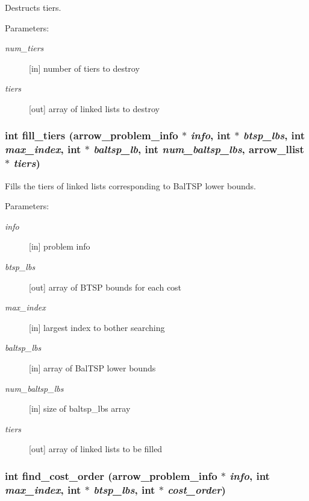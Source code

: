 Destructs tiers. 

\begin{Desc}
\item[Parameters:]
\begin{description}
\item[{\em num\_\-tiers}]\mbox{[}in\mbox{]} number of tiers to destroy \item[{\em tiers}]\mbox{[}out\mbox{]} array of linked lists to destroy \end{description}
\end{Desc}
\hypertarget{lib_2baltsp_2baltsp-ib_8c_42c557c4a5d3133300ce63b8b5e291c5}{
\subsubsection[{fill\_\-tiers}]{\setlength{\rightskip}{0pt plus 5cm}int fill\_\-tiers ({\bf arrow\_\-problem\_\-info} $\ast$ {\em info}, \/  int $\ast$ {\em btsp\_\-lbs}, \/  int {\em max\_\-index}, \/  int $\ast$ {\em baltsp\_\-lb}, \/  int {\em num\_\-baltsp\_\-lbs}, \/  {\bf arrow\_\-llist} $\ast$ {\em tiers})}}
\label{lib_2baltsp_2baltsp-ib_8c_42c557c4a5d3133300ce63b8b5e291c5}


Fills the tiers of linked lists corresponding to BalTSP lower bounds. 

\begin{Desc}
\item[Parameters:]
\begin{description}
\item[{\em info}]\mbox{[}in\mbox{]} problem info \item[{\em btsp\_\-lbs}]\mbox{[}out\mbox{]} array of BTSP bounds for each cost \item[{\em max\_\-index}]\mbox{[}in\mbox{]} largest index to bother searching \item[{\em baltsp\_\-lbs}]\mbox{[}in\mbox{]} array of BalTSP lower bounds \item[{\em num\_\-baltsp\_\-lbs}]\mbox{[}in\mbox{]} size of baltsp\_\-lbs array \item[{\em tiers}]\mbox{[}out\mbox{]} array of linked lists to be filled \end{description}
\end{Desc}
\hypertarget{lib_2baltsp_2baltsp-ib_8c_fe2b4359a26c49fe7602c86021b91ee7}{
\subsubsection[{find\_\-cost\_\-order}]{\setlength{\rightskip}{0pt plus 5cm}int find\_\-cost\_\-order ({\bf arrow\_\-problem\_\-info} $\ast$ {\em info}, \/  int {\em max\_\-index}, \/  int $\ast$ {\em btsp\_\-lbs}, \/  int $\ast$ {\em cost\_\-order})}}
\label{lib_2baltsp_2baltsp-ib_8c_fe2b4359a26c49fe7602c86021b91ee7}


